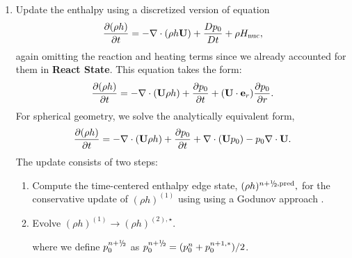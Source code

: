 \documentclass{aastex62}
\newcommand{\sfrac}[2]{\mathchoice
  {\kern0em\raise.5ex\hbox{\the\scriptfont0 #1}\kern-.15em/
   \kern-.15em\lower.25ex\hbox{\the\scriptfont0 #2}}
  {\kern0em\raise.5ex\hbox{\the\scriptfont0 #1}\kern-.15em/
   \kern-.15em\lower.25ex\hbox{\the\scriptfont0 #2}}
  {\kern0em\raise.5ex\hbox{\the\scriptscriptfont0 #1}\kern-.2em/
   \kern-.15em\lower.25ex\hbox{\the\scriptscriptfont0 #2}}
  {#1\!/#2}}
\newcommand{\myhalf}{\sfrac{1}{2}}
\newcommand{\eb}{{\bf{e}}}
\newcommand{\Ub}{{\bf{U}}}
\newcommand{\dt}{\Delta t}
\newcommand{\Hnuc}{H_{\rm nuc}}
\newcommand{\pred}{{\rm pred}}
\newcommand{\nph}{{n+\myhalf}}
\newcommand{\uadvone}{\Ub^{\mathrm{ADV},\star}}
\begin{document}
\begin{description}
\begin{enumerate}
\item Update the enthalpy using a discretized version of equation
%
\begin{equation}
\frac{\partial(\rho h)}{\partial t} = -\nabla\cdot(\rho h\Ub) + \frac{Dp_0}{Dt} + \rho\Hnuc,
\end{equation}
%
again omitting the reaction and heating terms
since we already accounted for
them in {\bf React State}.  This equation takes the form:
\begin{equation}
\frac{\partial (\rho h)}{\partial t}  = - \nabla \cdot (\Ub \rho h) + \frac{\partial p_0}{\partial t} + (\Ub \cdot \eb_r) \frac{\partial p_0}{\partial r}.
\end{equation}
For spherical geometry, we solve the
analytically equivalent form,
\begin{equation}
\frac{\partial (\rho h)}{\partial t}  = - \nabla \cdot (\Ub \rho h) + \frac{\partial p_0}{\partial t} + \nabla \cdot (\Ub p_0) - p_0 \nabla \cdot \Ub.
\end{equation}
The update consists of two steps:

\begin{enumerate}
\renewcommand{\labelenumii}{{\bf \roman{enumii}}.}

\item Compute the time-centered enthalpy edge state, $(\rho h)^{\nph,\pred},$
  for the conservative update of $(\rho h)^{(1)}$
  using using a Godunov approach \citep{XRB_III}.

\item Evolve $(\rho h)^{(1)} \rightarrow (\rho h)^{(2),\star}$.
where we define $p_0^\nph$ as $p_0^\nph = (p_0^n+p_0^{n+1,*})/2$.


\end{enumerate}
\end{enumerate}
\end{description}
\end{document}
